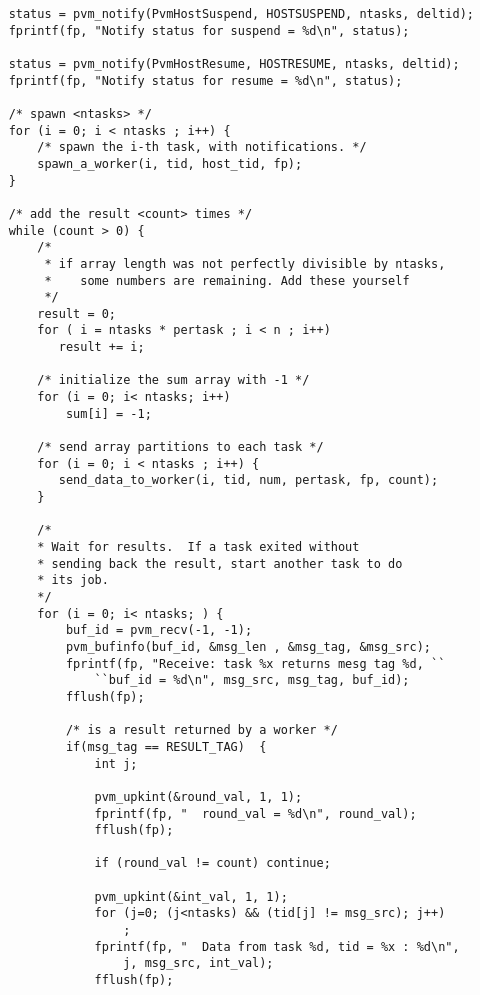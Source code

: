 \begin{verbatim}
    status = pvm_notify(PvmHostSuspend, HOSTSUSPEND, ntasks, deltid);
    fprintf(fp, "Notify status for suspend = %d\n", status);
     
    status = pvm_notify(PvmHostResume, HOSTRESUME, ntasks, deltid);
    fprintf(fp, "Notify status for resume = %d\n", status);

    /* spawn <ntasks> */
    for (i = 0; i < ntasks ; i++) {
        /* spawn the i-th task, with notifications. */
        spawn_a_worker(i, tid, host_tid, fp);
    }

    /* add the result <count> times */
    while (count > 0) {
        /* 
         * if array length was not perfectly divisible by ntasks, 
         *    some numbers are remaining. Add these yourself 
         */
        result = 0;
        for ( i = ntasks * pertask ; i < n ; i++)
           result += i;
     
        /* initialize the sum array with -1 */
        for (i = 0; i< ntasks; i++) 
            sum[i] = -1;
 
        /* send array partitions to each task */
        for (i = 0; i < ntasks ; i++) {
           send_data_to_worker(i, tid, num, pertask, fp, count);
        }

        /* 
        * Wait for results.  If a task exited without 
        * sending back the result, start another task to do
        * its job. 
        */
        for (i = 0; i< ntasks; ) {   
            buf_id = pvm_recv(-1, -1);
            pvm_bufinfo(buf_id, &msg_len , &msg_tag, &msg_src);
            fprintf(fp, "Receive: task %x returns mesg tag %d, ``
                ``buf_id = %d\n", msg_src, msg_tag, buf_id);
            fflush(fp);
           
            /* is a result returned by a worker */
            if(msg_tag == RESULT_TAG)  {
                int j;
                
                pvm_upkint(&round_val, 1, 1);
                fprintf(fp, "  round_val = %d\n", round_val);
                fflush(fp);
             
                if (round_val != count) continue;

                pvm_upkint(&int_val, 1, 1);
                for (j=0; (j<ntasks) && (tid[j] != msg_src); j++)
                    ;
                fprintf(fp, "  Data from task %d, tid = %x : %d\n", 
                    j, msg_src, int_val);
                fflush(fp);
                

\end{verbatim}
